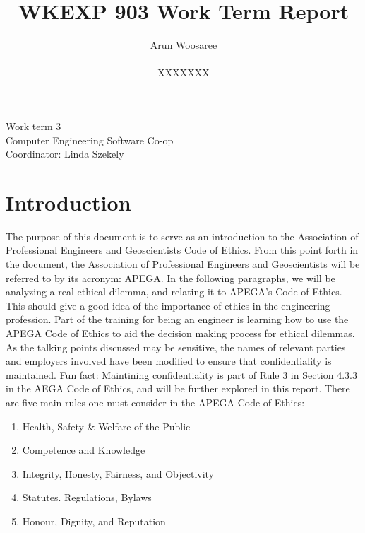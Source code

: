 \documentclass[letterpaper,12pt]{article}
\title{WKEXP 903 Work Term Report}
\author{Arun Woosaree \\ \\ XXXXXXX}
\begin{document}
\relax
\begin{titlepage}
 \maketitle
 \thispagestyle{empty} %
 \centering
 \large
 \vspace{1cm}
 Work term 3\\
 \vspace{1cm}
 Computer Engineering Software Co-op \\
 \vspace{1cm}
 Coordinator: Linda Szekely
\end{titlepage}

\section{Introduction}
The purpose of this document is to serve as an introduction to the Association of Professional Engineers and Geoscientists Code of Ethics\cite{apegacode}.
From this point forth in the document, the Association of Professional Engineers and Geoscientists will be referred to by its acronym: APEGA.
In the following paragraphs, we will be analyzing a real ethical dilemma, and relating it to APEGA's Code of Ethics. This should give a good idea
of the importance of ethics in the engineering profession. Part of the training for being an engineer is learning how to use the APEGA Code of Ethics 
to aid the decision making process for ethical dilemmas. As the talking points discussed may be sensitive, the names of relevant parties and employers involved have been modified to ensure that confidentiality is maintained.
Fun fact: Maintining confidentiality is part of Rule 3 in Section 4.3.3 in the AEGA Code of Ethics, and will be further explored in this report.
There are five main rules one must consider in the APEGA Code of Ethics:
\begin{enumerate}
    \setlength{\itemsep}{0pt}
    \setlength{\parskip}{0pt}
    \setlength{\parsep}{0pt} 
    \item Health, Safety \& Welfare of the Public
    \item Competence and Knowledge
    \item Integrity, Honesty, Fairness, and Objectivity
    \item Statutes. Regulations, Bylaws
    \item Honour, Dignity, and Reputation
\end{enumerate}
\end{document}
